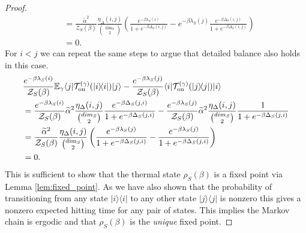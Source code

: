 \documentclass[
 amsmath,amssymb,
 aps,
onecolumn, 
nofootinbib]{revtex4-2}
\newcommand{\on}{\rm on}
\newcommand{\ket}[1]{|#1\rangle}
\newcommand{\bra}[1]{\langle #1|}
\newcommand{\ketbra}[2]{| #1\rangle\! \langle #2|}
\newcommand{\EE}{\mathbb{E}}
\newcommand{\TT}{\mathcal{T}}
\newcommand{\partfun}{\mathcal{Z}}
\begin{document}
\begin{proof}
\begin{align}
    &= \frac{\widetilde{\alpha}^2}{\partfun_S(\beta)} \frac{\eta_\Delta(i,j)}{\binom{\dim_S}{2}} \left(\frac{e^{-\beta \lambda_S(i)}}{1 + e^{-\beta \Delta_S(i,j)}} - e^{-\beta \lambda_S(j)} \frac{e^{-\beta \Delta_S(i,j)}}{1 + e^{-\beta \Delta_S(i,j)} } \right) \\
    &= 0.
\end{align}
For $i < j$ we can repeat the same steps to argue that detailed balance also holds in this case.
\begin{align}
    &\frac{e^{-\beta \lambda_S(i)}}{\partfun_S(\beta)} \EE_\gamma \bra{j} \TT_{\on}^{(\gamma)}(\ketbra{i}{i}) \ket{j} - \frac{e^{-\beta \lambda_S(j)}}{\partfun_S(\beta)} \bra{i} \TT_{\on}^{(\gamma)}(\ketbra{j}{j}) \ket{i} \nonumber \\
    &= \frac{e^{-\beta \lambda_S(i)}}{\partfun_S(\beta)} \widetilde{\alpha}^2 \frac{\eta_\Delta(i,j)}{\binom{dim_S}{2}} \frac{e^{-\beta \Delta_S(j, i)}}{1 + e^{-\beta \Delta_S(j, i)}} - \frac{e^{-\beta \lambda_S(j)}}{\partfun_S(\beta)} \widetilde{\alpha}^2 \frac{\eta_\Delta(i,j)}{\binom{dim_S}{2}} \frac{1}{1 + e^{-\beta \Delta_S(j, i)}} \\
    &= \frac{\widetilde{\alpha}^2}{\partfun_S(\beta)} \frac{\eta_\Delta(i,j)}{\binom{\dim_S}{2}} \left(\frac{e^{-\beta \lambda_S(j)}}{1 + e^{-\beta \Delta_S(j, i)}} - \frac{e^{-\beta \lambda_S(j)}}{1 + e^{-\beta \Delta_S(j, i)} } \right) \\
    &= 0.
\end{align}
This is sufficient to show that the thermal state $\rho_S(\beta)$ is a fixed point via Lemma \ref{lem:fixed_point}. As we have also shown that the probability of transitioning from any state $\ketbra{i}{i}$ to any other state $\ketbra{j}{j}$ is nonzero this gives a nonzero expected hitting time for any pair of states. This implies the Markov chain is ergodic and that $\rho_S(\beta)$ is the \emph{unique} fixed point.


\end{proof}
\end{document}
